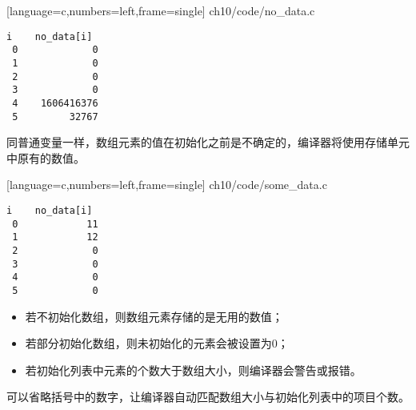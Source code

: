 \begin{frame}[fragile]

[language=c,numbers=left,frame=single]
{ch10/code/no_data.c}
\end{frame}

\begin{frame}[fragile]
\begin{lstlisting}[backgroundcolor=\color{red!20}]
 i    no_data[i]
 0             0
 1             0
 2             0
 3             0
 4    1606416376
 5         32767
\end{lstlisting}
\end{frame}

\begin{frame}[fragile]
同普通变量一样，数组元素的值在初始化之前是不确定的，编译器将使用存储单元中原有的数值。
\end{frame}

\begin{frame}[fragile]

[language=c,numbers=left,frame=single]
{ch10/code/some_data.c}
\end{frame}

\begin{frame}[fragile]
\begin{lstlisting}[backgroundcolor=\color{red!20}]
 i    no_data[i]
 0            11
 1            12
 2             0
 3             0
 4             0
 5             0
\end{lstlisting}
\end{frame}

\begin{frame}[fragile]
\begin{itemize}
\item
若不初始化数组，则数组元素存储的是无用的数值；\\[0.1in]
\item
若部分初始化数组，则未初始化的元素会被设置为0；\\[0.1in]
\item
若初始化列表中元素的个数大于数组大小，则编译器会警告或报错。
\end{itemize}
\end{frame}

\begin{frame}[fragile]
可以省略括号中的数字，让编译器自动匹配数组大小与初始化列表中的项目个数。
\end{frame}

